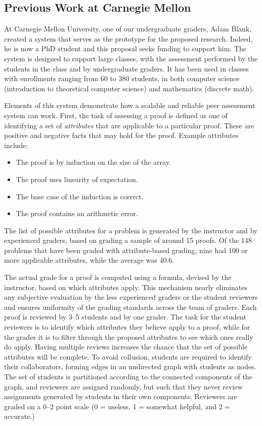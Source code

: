 \documentclass[12pt]{article}
\begin{document}
\subsection{Previous Work at Carnegie Mellon}

At Carnegie Mellon University, one of our undergraduate graders, Adam
Blank, created a system that serves as the prototype for the proposed
research.  Indeed, he is now a PhD student and this proposal seeks
funding to support him.  The system is designed to support large classes,
with the assessment performed by the students in the class and by
undergraduate graders.  It has been used in classes with enrollments
ranging from 60 to 380 students, in both computer science (introduction
to theoretical computer science) and mathematics (discrete math).

Elements of this system demonstrate 
how a scalable and reliable peer assessment system can work.  First,
the task of assessing a proof is defined as one of identifying a set of
{\em attributes} that are applicable to a particular proof.  These are
positive and negative facts that may hold for the proof.  Example
attributes include:
\begin{itemize}
\item The proof is by induction on the size of the array.
\item The proof uses linearity of expectation.
\item The base case of the induction is correct.
\item The proof contains an arithmetic error.
\end{itemize}
The list of possible attributes for a problem is generated by the
instructor and by experienced graders, based on grading a sample of
around 15 proofs.  Of the 148 problems that have been graded with
attribute-based grading, nine had 100 or more applicable attributes,
while the average was 40.6.

The actual grade for a proof is computed using a formula, devised
by the instructor, based on which attributes apply.  This mechanism
nearly eliminates any subjective evaluation by the less experienced graders
or the student reviewers and ensures uniformity of the grading
standards across the team of graders.  Each proof is reviewed by 3--5
students and by one grader.  The task for the student reviewers is to
identify which attributes they believe apply to a proof, while for the
grader it is to filter through the proposed attributes to see which
ones really do apply.  Having multiple reviews increases the chance
that the set of possible attributes will be complete.  To avoid
collusion, students are required to identify their collaborators,
forming edges in an undirected graph with students as nodes.  The
set of students is partitioned according to the connected components
of the graph, and
reviewers are assigned randomly, but such that they never review
assignments generated by students in their own components.  Reviewers
are graded on a 0--2 point scale (0 = useless, 1 = somewhat helpful,
and 2 = accurate.) 
\end{document}
